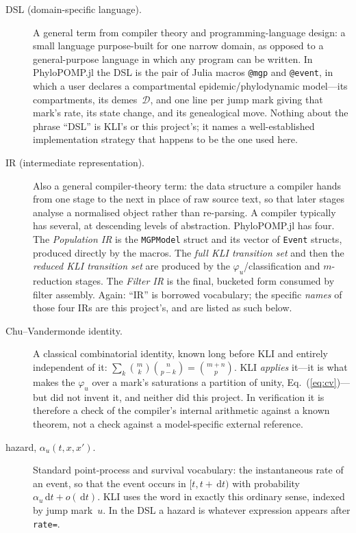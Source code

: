 \documentclass[11pt,leqno]{article}
\newcommand{\Demes}{\mathcal{D}}    %
\newcommand{\dd}[1]{\,\mathrm{d}{#1}}
\newcommand{\pkg}[1]{\textsf{#1}}
\newcommand{\code}[1]{\texttt{#1}}
\theoremstyle{plain}
\theoremstyle{definition}
\begin{document}
\begin{description}

\item[DSL (domain-specific language).]  A general term from compiler theory
  and programming-language design: a small language purpose-built for one
  narrow domain, as opposed to a general-purpose language in which any
  program can be written.  In \pkg{PhyloPOMP.jl} the DSL is the pair of Julia
  macros \code{@mgp} and \code{@event}, in which a user declares a
  compartmental epidemic/phylodynamic model---its compartments, its
  demes~$\Demes$, and one line per jump mark giving that mark's rate, its
  state change, and its genealogical move.  Nothing about the phrase ``DSL''
  is KLI's or this project's; it names a well-established implementation
  strategy that happens to be the one used here.

\item[IR (intermediate representation).]  Also a general compiler-theory
  term: the data structure a compiler hands from one stage to the next in
  place of raw source text, so that later stages analyse a normalised object
  rather than re-parsing.  A compiler typically has several, at descending
  levels of abstraction.  \pkg{PhyloPOMP.jl} has four.  The
  \emph{Population IR} is the \code{MGPModel} struct and its vector of
  \code{Event} structs, produced directly by the macros.  The
  \emph{full KLI transition set} and then the \emph{reduced KLI transition
  set} are produced by the $\varphi_u$/classification and $m$-reduction
  stages.  The \emph{Filter IR} is the final, bucketed form consumed by
  filter assembly.  Again: ``IR'' is borrowed vocabulary; the specific
  \emph{names} of those four IRs are this project's, and are listed as such
  below.

\item[Chu--Vandermonde identity.]  A classical combinatorial identity,
  known long before KLI and entirely independent of it:
  $\sum_k \binom{m}{k}\binom{n}{p-k} = \binom{m+n}{p}$.  KLI \emph{applies}
  it---it is what makes the $\varphi_u$ over a mark's saturations a
  partition of unity, Eq.~(\ref{eq:cv})---but did not invent it, and neither
  did this project.  In verification it is therefore a check of the
  compiler's internal arithmetic against a known theorem, not a check
  against a model-specific external reference.

\item[hazard, $\alpha_u(t,x,x')$.]  Standard point-process and survival
  vocabulary: the instantaneous rate of an event, so that the event occurs
  in $[t, t+\dd{t})$ with probability $\alpha_u \dd{t} + o(\dd{t})$.  KLI
  uses the word in exactly this ordinary sense, indexed by jump mark~$u$.
  In the DSL a hazard is whatever expression appears after \code{rate=}.


\end{description}
\end{document}

